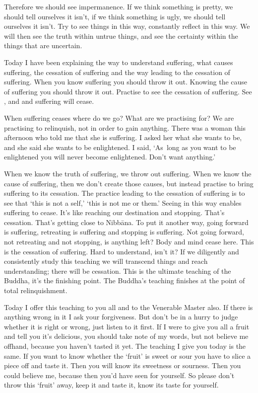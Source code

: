 Therefore we should see impermanence. If we think something is pretty, we should tell ourselves it isn't, if we think something is ugly, we should tell ourselves it isn't. Try to see things in this way, constantly reflect in this way. We will then see the truth within untrue things, and see the certainty within the things that are uncertain. 

Today I have been explaining the way to understand suffering, what causes suffering, the cessation of suffering and the way leading to the cessation of suffering. When you know suffering you should throw it out. Knowing the cause of suffering you should throw it out. Practise to see the cessation of suffering. See ,  and  and suffering will cease. 

When suffering ceases where do we go? What are we practising for? We are practising to relinquish, not in order to gain anything. There was a woman this afternoon who told me that she is suffering. I asked her what she wants to be, and she said she wants to be enlightened. I said, `As~long as you want to be enlightened you will never become enlightened. Don't want anything.' 

When we know the truth of suffering, we throw out suffering. When we know the cause of suffering, then we don't create those causes, but instead practise to bring suffering to its cessation. The practice leading to the cessation of suffering is to see that `this is not a self,' `this is not me or them.' Seeing in this way enables suffering to cease. It's like reaching our destination and stopping. That's cessation. That's getting close to Nibb\=ana. To put it another way, going forward is suffering, retreating is suffering and stopping is suffering. Not going forward, not retreating and not stopping, is anything left? Body and mind cease here. This is the cessation of suffering. Hard to understand, isn't it? If we diligently and consistently study this teaching we will transcend things and reach understanding; there will be cessation. This is the ultimate teaching of the Buddha, it's the finishing point. The Buddha's teaching finishes at the point of total relinquishment. 

Today I offer this teaching to you all and to the Venerable Master also. If there is anything wrong in it I ask your forgiveness. But don't be in a hurry to judge whether it is right or wrong, just listen to it first. If I were to give you all a fruit and tell you it's delicious, you should take note of my words, but not believe me offhand, because you haven't tasted it yet. The teaching I give you today is the same. If you want to know whether the `fruit' is sweet or sour you have to slice a piece off and taste it. Then you will know its sweetness or sourness. Then you could believe me, because then you'd have seen for yourself. So please don't throw this `fruit' away, keep it and taste it, know its taste for yourself. 

